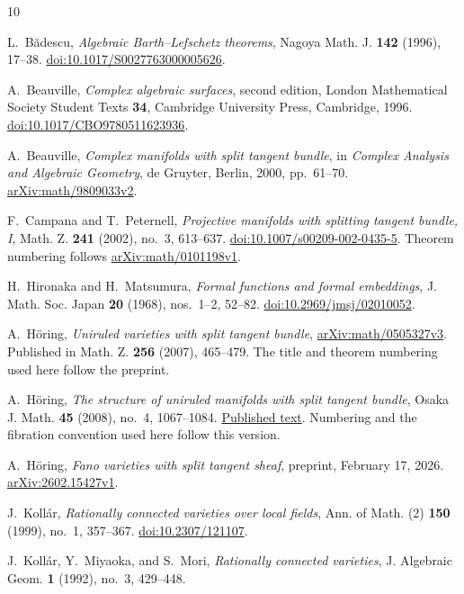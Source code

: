 \begin{thebibliography}{10}
\raggedright

L.~B\u{a}descu,
\emph{Algebraic Barth--Lefschetz theorems},
Nagoya Math. J. \textbf{142} (1996), 17--38.
\href{https://doi.org/10.1017/S0027763000005626}
{doi:10.1017/S0027763000005626}.

A.~Beauville,
\emph{Complex algebraic surfaces}, second edition,
London Mathematical Society Student Texts \textbf{34},
Cambridge University Press, Cambridge, 1996.
\href{https://doi.org/10.1017/CBO9780511623936}
{doi:10.1017/CBO9780511623936}.

A.~Beauville,
\emph{Complex manifolds with split tangent bundle},
in \emph{Complex Analysis and Algebraic Geometry},
de Gruyter, Berlin, 2000, pp.~61--70.
\href{https://arxiv.org/abs/math/9809033v2}
{arXiv:math/9809033v2}.

F.~Campana and T.~Peternell,
\emph{Projective manifolds with splitting tangent bundle, I},
Math. Z. \textbf{241} (2002), no.~3, 613--637.
\href{https://doi.org/10.1007/s00209-002-0435-5}
{doi:10.1007/s00209-002-0435-5}.
Theorem numbering follows
\href{https://arxiv.org/abs/math/0101198v1}
{arXiv:math/0101198v1}.

H.~Hironaka and H.~Matsumura,
\emph{Formal functions and formal embeddings},
J. Math. Soc. Japan \textbf{20} (1968), nos.~1--2, 52--82.
\href{https://doi.org/10.2969/jmsj/02010052}
{doi:10.2969/jmsj/02010052}.

A.~H\"oring,
\emph{Uniruled varieties with split tangent bundle},
\href{https://arxiv.org/abs/math/0505327v3}
{arXiv:math/0505327v3}.
Published in Math. Z. \textbf{256} (2007), 465--479.
The title and theorem numbering used here follow the preprint.

A.~H\"oring,
\emph{The structure of uniruled manifolds with split tangent bundle},
Osaka J. Math. \textbf{45} (2008), no.~4, 1067--1084.
\href{https://www.i-repository.net/contents/osakacu/sugaku/111F0000002-04504-14.pdf}
{Published text}.
Numbering and the fibration convention used here follow this version.

A.~H\"oring,
\emph{Fano varieties with split tangent sheaf},
preprint, February 17, 2026.
\href{https://arxiv.org/abs/2602.15427v1}
{arXiv:2602.15427v1}.

J.~Koll\'ar,
\emph{Rationally connected varieties over local fields},
Ann. of Math. (2) \textbf{150} (1999), no.~1, 357--367.
\href{https://doi.org/10.2307/121107}
{doi:10.2307/121107}.

J.~Koll\'ar, Y.~Miyaoka, and S.~Mori,
\emph{Rationally connected varieties},
J. Algebraic Geom. \textbf{1} (1992), no.~3, 429--448.

\end{thebibliography}
